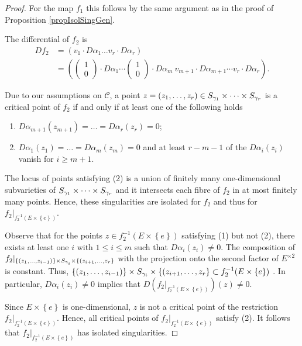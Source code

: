 \begin{proof}
 For the map $f_1$ this follows by the same argument as in the proof of Proposition \ref{propIsolSingGen}. 
 
 The differential of $f_2$ is 
\begin{align*}
 Df_2 &= \left(v_1\cdot D\alpha_1 \dots v_r\cdot D\alpha_r\right)\\
      &= \left( \left( \begin{array}{c} 1\\ 0 \end{array}\right)\cdot D\alpha_1 \cdots \left(\begin{array}{c} 1\\ 0 \end{array} \right)\cdot D\alpha_m ~ v_{m+1} \cdot D\alpha_{m+1}\cdots v_r \cdot D \alpha_r\right).
\end{align*}

Due to our assumptions on $\mathcal{C}$, a point $z=(z_1,\dots,z_r)\in S_{\gamma_1}\times \dots \times S_{\gamma_r}$ is a critical point of $f_2$ if and only if at least one of the following holds
\begin{enumerate}
 \item $D\alpha_{m+1} (z_{m+1})=\dots = D\alpha_r (z_r)=0$;
 \item $D\alpha_1 (z_1)=\dots = D\alpha_m(z_m)= 0$ and at least $r-m-1$ of the $D\alpha_i(z_i)$ vanish for $i\geq m+1$.
\end{enumerate}

The locus of points satisfying (2) is a union of finitely many one-dimensional subvarieties of $S_{\gamma_1} \times \dots \times S_{\gamma_r}$ and it intersects each fibre of $f_2$ in at most finitely many points. Hence, these singularities are isolated for $f_2$ and thus for $f_2|_{f_2^{-1}(E\times \left\{e\right\})}$.

Observe that for the points $z\in f_2^{-1}(E\times \left\{e\right\})$ satisfying (1) but not (2), there exists at least one $i$ with $1\leq i\leq m$ such that $D\alpha_i(z_i)\neq 0$. The composition of $f_2|_{\left\{(z_1,\dots,z_{i-1})\right\} \times S_{\gamma_i} \times \left\{ (z_{i+1},\dots, z_r\right\}}$ with the projection onto the second factor of $E^{\times 2}$ is constant. Thus, $\left\{(z_1,\dots,z_{i-1})\right\} \times S_{\gamma_i} \times \left\{ (z_{i+1},\dots, z_r\right\} \subset f_2^{-1}(E\times \left\{e\right\})$ . In particular, $D\alpha_i(z_i)\neq 0$ implies that $D(f_2|_{f_2^{-1}(E\times \left\{e\right\})})(z)\neq 0$. 

Since $E\times \left\{e\right\}$ is one-dimensional, $z$ is not a critical point of the restriction $f_2|_{f_2^{-1}(E\times \left\{e\right\})}$. Hence, all critical points of $f_2|_{f_2^{-1}(E\times \left\{e\right\})}$ satisfy (2). It follows that $f_2|_{f_2^{-1}(E\times \left\{e\right\})}$ has isolated singularities.
\end{proof}

